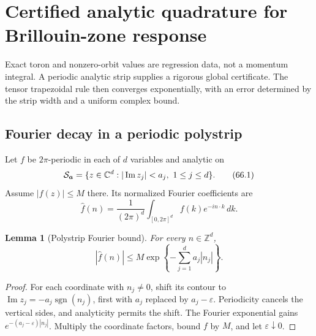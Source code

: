 \documentclass[11pt]{article}
\newtheorem{lemma}[theorem]{Lemma}
\begin{document}

\section{Certified analytic quadrature for Brillouin-zone response}
\label{sec:v11v66}

Exact toron and nonzero-orbit values are regression data, not a
momentum integral.  A periodic analytic strip supplies a rigorous
global certificate.  The tensor trapezoidal rule then converges
exponentially, with an error determined by the strip width and a
uniform complex bound.

\subsection{Fourier decay in a periodic polystrip}

Let \(f\) be \(2\pi\)-periodic in each of \(d\) variables and analytic
on
\[
 {\cal S}_{\boldsymbol a}
 =\{z\in\mathbb C^d:|\operatorname{Im}z_j|<a_j,\ 1\le j\le d\}.
                                                                  \tag{66.1}
\]
Assume \(|f(z)|\le M\) there.  Its normalized Fourier coefficients are
\[
 \widehat f(n)=\frac1{(2\pi)^d}
   \int_{[0,2\pi]^d}f(k)e^{-in\cdot k}\,dk.                   \tag{66.2}
\]

\begin{lemma}[Polystrip Fourier bound]
\label{lem:v11v66-fourier}
For every \(n\in\mathbb Z^d\),
\[
                         |\widehat f(n)|
                    \le M\exp\left\{-\sum_{j=1}^da_j|n_j|\right\}.
                                                                  \tag{66.3}
\]
\end{lemma}

\begin{proof}
For each coordinate with \(n_j\ne0\), shift its contour to
\(\operatorname{Im}z_j=-a_j\operatorname{sgn}(n_j)\), first with
\(a_j\) replaced by \(a_j-\varepsilon\).  Periodicity cancels the
vertical sides, and analyticity permits the shift.  The Fourier
exponential gains
\(e^{-(a_j-\varepsilon)|n_j|}\).  Multiply the coordinate factors,
bound \(f\) by \(M\), and let \(\varepsilon\downarrow0\).
\end{proof}
\end{document}
